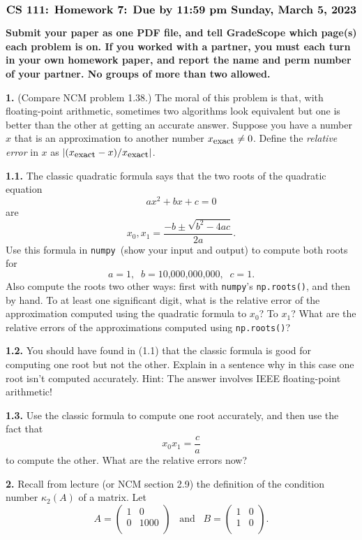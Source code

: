 \documentclass[11pt]{article}
\newcommand{\numpy}{{\tt numpy}}            %
\newcommand{\exact}{{\mbox{\small exact}}}  %
\begin{document}
$$\mbox{\Large \bf CS 111: Homework 7: Due by 11:59 pm Sunday, March 5, 2023}$$
\par\smallskip\noindent
{\bf Submit your paper as one PDF file,
and tell GradeScope which page(s) each problem is on.
If you worked with a partner, you must each turn in your own 
homework paper, and report the name and perm number of your partner.
No groups of more than two allowed.
}

\par\bigskip
{\bf 1.} (Compare NCM problem 1.38.)
The moral of this problem is that, with floating-point arithmetic,
sometimes two algorithms look equivalent but one is better than the other
at getting an accurate answer.
Suppose you have a number $x$ that is an approximation to another number $x_\exact\ne0$.
Define the {\em relative error} in $x$ as 
$|(x_\exact - x) / x_\exact |$.

\par\medskip
{\bf 1.1.}
The classic quadratic formula says that the two roots of the quadratic equation
$$ ax^2 + bx + c = 0$$
are
$$ x_0, x_1 = \frac{-b\pm\sqrt{b^2-4ac}}{2a}. $$
Use this formula in \numpy\ (show your input and output) to compute both roots for
$$ a = 1, \;\; b = \mbox{10,000,000,000}, \;\; c = 1. $$
Also compute the roots two other ways: 
first with \numpy's {\tt np.roots()}, and then by hand.
To at least one significant digit, what is the relative error of the 
approximation computed using the quadratic formula to $x_0$? To $x_1$?
What are the relative errors of the approximations computed using {\tt np.roots()}?

\par\medskip
{\bf 1.2.}
You should have found in (1.1) that the classic formula is good for 
computing one root but not the other. 
Explain in a sentence why in this case one root isn't computed accurately.
Hint: The answer involves IEEE floating-point arithmetic!

\par\medskip
{\bf 1.3.}
Use the classic formula to compute one root accurately, and then use the
fact that
$$ x_0x_1 = \frac{c}{a} $$
to compute the other.
What are the relative errors now?

\par\bigskip
{\bf 2.}
Recall from lecture (or NCM section 2.9) the definition of
the condition number $\kappa_2(A)$ of a matrix. Let
$$
   A =
   \left(
   \begin{array}{cc}
    1 & 0 \\ 	
    0 & 1000 \\ 
   \end{array} \right)
   \hspace{10pt}
   \mbox{and}
   \hspace{10pt}
   B =
   \left(
   \begin{array}{cc}
    1 & 0 \\ 	
    1 & 0 \\ 
   \end{array} \right).
$$
\end{document}
